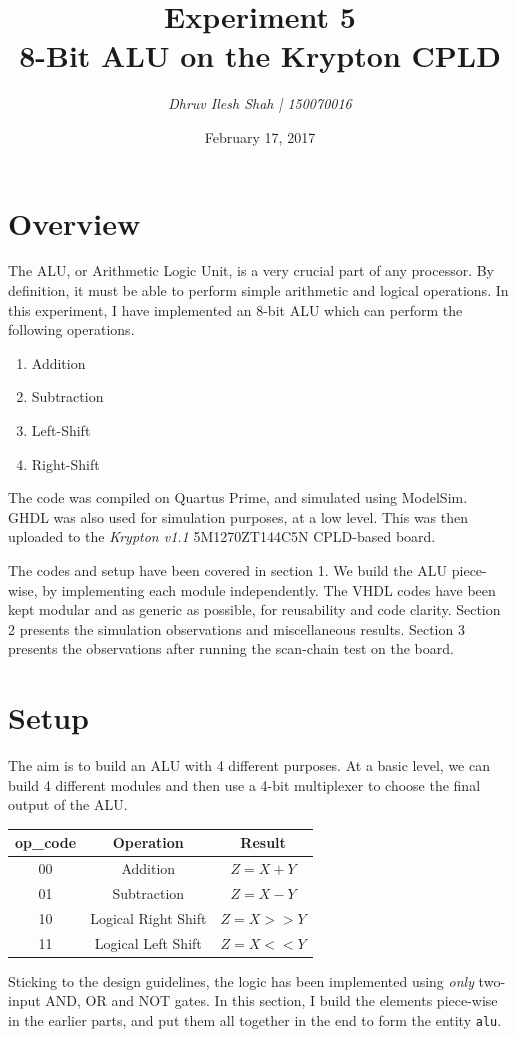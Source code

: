 \documentclass[a4paper, 11pt]{article}
\title{\bf Experiment 5\\\vspace*{2mm} 8-Bit ALU on the Krypton CPLD}
\author{\it Dhruv Ilesh Shah | 150070016}
\date{February 17, 2017}
\begin{document}
\maketitle
\section*{Overview}
The ALU, or Arithmetic Logic Unit, is a very crucial part of any processor. By definition, it must be able to perform simple arithmetic and logical operations. In this experiment, I have implemented an 8-bit ALU which can perform the following operations.
\begin{enumerate}

	\item Addition
	\item Subtraction
	\item Left-Shift
	\item Right-Shift
\end{enumerate}

The code was compiled on Quartus Prime, and simulated using ModelSim. GHDL was also used for simulation purposes, at a low level. This was then uploaded to the {\em Krypton v1.1} 5M1270ZT144C5N CPLD-based board.

The codes and setup have been covered in section 1. We build the ALU piece-wise, by implementing each module independently. The VHDL codes have been kept modular and as generic as possible, for reusability and code clarity. Section 2 presents the simulation observations and miscellaneous results. Section 3 presents the observations after running the scan-chain test on the board.

\section{Setup}

The aim is to build an ALU with 4 different purposes. At a basic level, we can build 4 different modules and then use a 4-bit multiplexer to choose the final output of the ALU.
\begin{center}

\begin{tabular}{| c | c | c |}
\hline
\bf op\_code & \bf Operation & \bf Result  \\
\hline 
00 & Addition & $Z = X + Y$ \\
01 & Subtraction & $Z = X - Y$ \\
10 & Logical Right Shift & $Z = X >> Y$ \\
11 & Logical Left Shift & $Z = X << Y$ \\
\hline
\end{tabular}
\end{center}
Sticking to the design guidelines, the logic has been implemented using \emph{only} two-input AND, OR and NOT gates. In this section, I build the elements piece-wise in the earlier parts, and put them all together in the end to form the entity \texttt{alu}.
\end{document}
